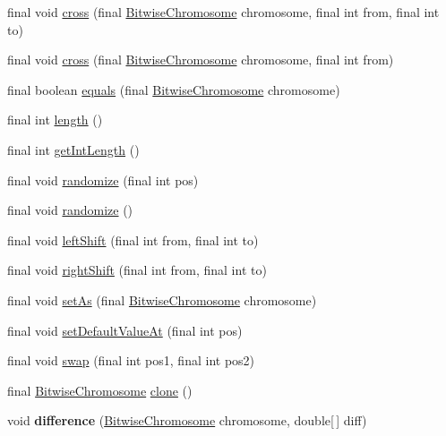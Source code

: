 \begin{DoxyCompactItemize}
\item 
final void \hyperlink{classjenes_1_1chromosome_1_1_bitwise_chromosome_a2d711baa2a74ccb064d33ef73edbd464}{cross} (final \hyperlink{classjenes_1_1chromosome_1_1_bitwise_chromosome}{Bitwise\-Chromosome} chromosome, final int from, final int to)
\item 
final void \hyperlink{classjenes_1_1chromosome_1_1_bitwise_chromosome_a933b1991999fa3b586c1739744751725}{cross} (final \hyperlink{classjenes_1_1chromosome_1_1_bitwise_chromosome}{Bitwise\-Chromosome} chromosome, final int from)
\item 
final boolean \hyperlink{classjenes_1_1chromosome_1_1_bitwise_chromosome_a41c9858f7ef05194011d1e227fea3584}{equals} (final \hyperlink{classjenes_1_1chromosome_1_1_bitwise_chromosome}{Bitwise\-Chromosome} chromosome)
\item 
final int \hyperlink{classjenes_1_1chromosome_1_1_bitwise_chromosome_a0da8899c89f8b1f222526acf1d2e8519}{length} ()
\item 
final int \hyperlink{classjenes_1_1chromosome_1_1_bitwise_chromosome_a5878e8d0ace81cfb617f75109c02855d}{get\-Int\-Length} ()
\item 
final void \hyperlink{classjenes_1_1chromosome_1_1_bitwise_chromosome_a1a79d4c9c671d2f735d57d64c59dfdb8}{randomize} (final int pos)
\item 
final void \hyperlink{classjenes_1_1chromosome_1_1_bitwise_chromosome_a8028fde93528b7b51313f6c311b2b640}{randomize} ()
\item 
final void \hyperlink{classjenes_1_1chromosome_1_1_bitwise_chromosome_ab02c791be30c931cae793289185e459f}{left\-Shift} (final int from, final int to)
\item 
final void \hyperlink{classjenes_1_1chromosome_1_1_bitwise_chromosome_afb689c4b268f7954214a9d0e13c6141e}{right\-Shift} (final int from, final int to)
\item 
final void \hyperlink{classjenes_1_1chromosome_1_1_bitwise_chromosome_aa4fbad5a25ae14e9524a6ff0ec2536ca}{set\-As} (final \hyperlink{classjenes_1_1chromosome_1_1_bitwise_chromosome}{Bitwise\-Chromosome} chromosome)
\item 
final void \hyperlink{classjenes_1_1chromosome_1_1_bitwise_chromosome_ae5be5fc21ff47526230a8a13ca945c08}{set\-Default\-Value\-At} (final int pos)
\item 
final void \hyperlink{classjenes_1_1chromosome_1_1_bitwise_chromosome_afac4935f0e1d92b6b1aaf9de024e8cbb}{swap} (final int pos1, final int pos2)
\item 
final \hyperlink{classjenes_1_1chromosome_1_1_bitwise_chromosome}{Bitwise\-Chromosome} \hyperlink{classjenes_1_1chromosome_1_1_bitwise_chromosome_a2140b588068c430eaea7e9a7a5fe6b00}{clone} ()
\item 
\hypertarget{classjenes_1_1chromosome_1_1_bitwise_chromosome_a33de872210289a305bc869c61a02eddb}{void {\bfseries difference} (\hyperlink{classjenes_1_1chromosome_1_1_bitwise_chromosome}{Bitwise\-Chromosome} chromosome, double\mbox{[}$\,$\mbox{]} diff)}\label{classjenes_1_1chromosome_1_1_bitwise_chromosome_a33de872210289a305bc869c61a02eddb}


\end{DoxyCompactItemize}
